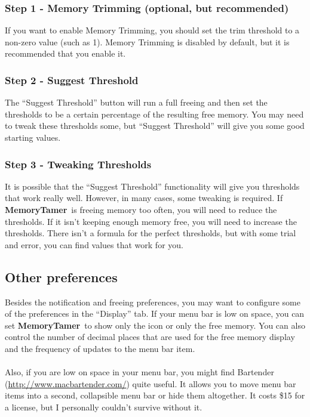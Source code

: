 \documentclass[]{article}
\newcommand{\MT}{\textbf{MemoryTamer}}
\begin{document}
\subsubsection*{Step 1 - Memory Trimming (optional, but recommended)}
If you want to enable Memory Trimming, you should set the trim threshold to a non-zero value (such as 1).  Memory Trimming is disabled by default, but it is recommended that you enable it.

\subsubsection*{Step 2 - Suggest Threshold}
The ``Suggest Threshold'' button will run a full freeing and then set the thresholds to be a certain percentage of the resulting free memory.  You may need to tweak these thresholds some, but ``Suggest Threshold'' will give you some good starting values.

\subsubsection*{Step 3 - Tweaking Thresholds}
It is possible that the ``Suggest Threshold'' functionality will give you thresholds that work really well.  However, in many cases, some tweaking is required.  If \MT\ is freeing memory too often, you will need to reduce the thresholds.  If it isn't keeping enough memory free, you will need to increase the thresholds.  There isn't a formula for the perfect thresholds, but with some trial and error, you can find values that work for you.

\subsection{Other preferences}
Besides the notification and freeing preferences, you may want to configure some of the preferences in the ``Display'' tab.  If your menu bar is low on space, you can set \MT\ to show only the icon or only the free memory.  You can also control the number of decimal places that are used for the free memory display and the frequency of updates to the menu bar item.\\
\\
Also, if you are low on space in your menu bar, you might find Bartender (\url{http://www.macbartender.com/}) quite useful.  It allows you to move menu bar items into a second, collapsible menu bar or hide them altogether.  It costs \$15 for a license, but I personally couldn't survive without it.
\end{document}
